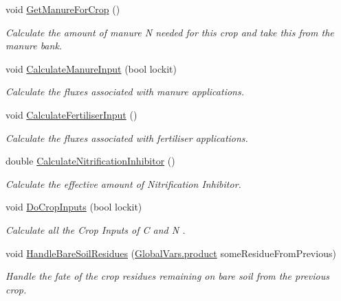 \begin{DoxyCompactItemize}
\mbox{\label{class_crop_class_ad7e6adfa5dfd99f0f748eedab3b3e336}} 
void \mbox{\hyperlink{class_crop_class_ad7e6adfa5dfd99f0f748eedab3b3e336}{Get\+Manure\+For\+Crop}} ()
\begin{DoxyCompactList}\small\item\em Calculate the amount of manure N needed for this crop and take this from the manure bank. \end{DoxyCompactList}\item 
void \mbox{\hyperlink{class_crop_class_a42e1e825d1c1377dee711b761f1453fc}{Calculate\+Manure\+Input}} (bool lockit)
\begin{DoxyCompactList}\small\item\em Calculate the fluxes associated with manure applications. \end{DoxyCompactList}\item 
void \mbox{\hyperlink{class_crop_class_a8266c04c74b6f19d1f58073acc18b3a5}{Calculate\+Fertiliser\+Input}} ()
\begin{DoxyCompactList}\small\item\em Calculate the fluxes associated with fertiliser applications. \end{DoxyCompactList}\item 
double \mbox{\hyperlink{class_crop_class_a331622d69775779cd0865a7ee675f8cd}{Calculate\+Nitrification\+Inhibitor}} ()
\begin{DoxyCompactList}\small\item\em Calculate the effective amount of Nitrification Inhibitor. \end{DoxyCompactList}\item 
void \mbox{\hyperlink{class_crop_class_ab2d8d3cbf83e1dacd6e57f02199b4e5d}{Do\+Crop\+Inputs}} (bool lockit)
\begin{DoxyCompactList}\small\item\em Calculate all the Crop Inputs of C and N . \end{DoxyCompactList}\item 
void \mbox{\hyperlink{class_crop_class_ab6c8a1cbfc2dd57c34344081cc6c9ed4}{Handle\+Bare\+Soil\+Residues}} (\mbox{\hyperlink{class_global_vars_1_1product}{Global\+Vars.\+product}} some\+Residue\+From\+Previous)
\begin{DoxyCompactList}\small\item\em Handle the fate of the crop residues remaining on bare soil from the previous crop. \end{DoxyCompactList}\item 

\end{DoxyCompactItemize}
